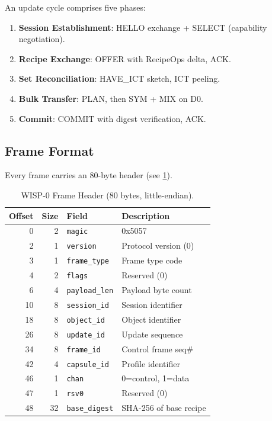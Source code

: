 \documentclass[11pt,twocolumn]{article}
\theoremstyle{definition}
\begin{document}
An update cycle comprises five phases:

\begin{enumerate}
  \item \textbf{Session Establishment}: HELLO exchange + SELECT
    (capability negotiation).
  \item \textbf{Recipe Exchange}: OFFER with RecipeOps delta, ACK.
  \item \textbf{Set Reconciliation}: HAVE\_ICT sketch, ICT peeling.
  \item \textbf{Bulk Transfer}: PLAN, then SYM + MIX on D0.
  \item \textbf{Commit}: COMMIT with digest verification, ACK.
\end{enumerate}

\subsection{Frame Format}

Every frame carries an 80-byte header (see \cref{tab:header}).

\begin{table}[t]
\centering
\caption{WISP-0 Frame Header (80 bytes, little-endian).}
\label{tab:header}
\small
\begin{tabular}{@{}rrlp{3.2cm}@{}}
\toprule
Offset & Size & Field & Description \\
\midrule
0  & 2  & \texttt{magic}        & 0x5057 \\
2  & 1  & \texttt{version}      & Protocol version (0) \\
3  & 1  & \texttt{frame\_type}  & Frame type code \\
4  & 2  & \texttt{flags}        & Reserved (0) \\
6  & 4  & \texttt{payload\_len} & Payload byte count \\
10 & 8  & \texttt{session\_id}  & Session identifier \\
18 & 8  & \texttt{object\_id}   & Object identifier \\
26 & 8  & \texttt{update\_id}   & Update sequence \\
34 & 8  & \texttt{frame\_id}    & Control frame seq\# \\
42 & 4  & \texttt{capsule\_id}  & Profile identifier \\
46 & 1  & \texttt{chan}          & 0=control, 1=data \\
47 & 1  & \texttt{rsv0}         & Reserved (0) \\
48 & 32 & \texttt{base\_digest} & SHA-256 of base recipe \\
\bottomrule
\end{tabular}
\end{table}
\end{document}
